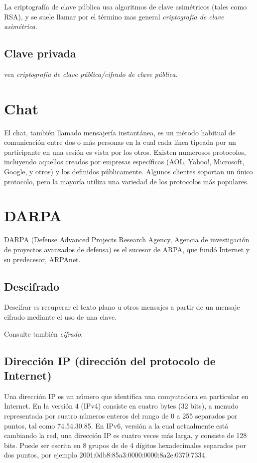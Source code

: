 La criptografía de clave pública usa algoritmos de clave asimétricos
(tales como RSA), y se suele llamar por el término mas general
\emph{criptografía de clave asimétrica}.

\subsection{Clave privada}\label{clave-privada}

vea \emph{criptografía de clave pública/cifrado de clave pública}.

\section{Chat}\label{chat}

El chat, también llamado mensajería instantánea, es un método habitual
de comunicación entre dos o más personas en la cual cada línea tipeada
por un participante en una sesión es vista por los otros. Existen
numerosos protocolos, incluyendo aquellos creados por empresas
específicas (AOL, Yahoo!, Microsoft, Google, y otros) y los definidos
públicamente. Algunos clientes soportan un único protocolo, pero la
mayoría utiliza una variedad de los protocolos más populares.

\section{DARPA}\label{darpa}

DARPA (Defense Advanced Projects Research Agency, Agencia de
investigación de proyectos avanzados de defensa) es el sucesor de ARPA,
que fundó Internet y su predecesor, ARPAnet.

\subsection{Descifrado}\label{descifrado}

Descifrar es recuperar el texto plano u otros mensajes a partir de un
mensaje cifrado mediante el uso de una clave.

Consulte también \emph{cifrado}.

\subsection{Dirección IP (dirección del protocolo de
Internet)}\label{direcciuxf3n-ip-direcciuxf3n-del-protocolo-de-internet}

Una dirección IP es un número que identifica una computadora en
particular en Internet. En la versión 4 (IPv4) consiste en cuatro bytes
(32 bits), a menudo representada por cuatro números enteros del rango de
0 a 255 separados por puntos, tal como 74.54.30.85. En IPv6, versión a
la cual actualmente está cambiando la red, una dirección IP es cuatro
veces más larga, y consiste de 128 bits. Puede ser escrita en 8 grupos
de de 4 dígitos hexadecimales separados por dos puntos, por ejemplo
2001:0db8:85a3:0000:0000:8a2e:0370:7334.

